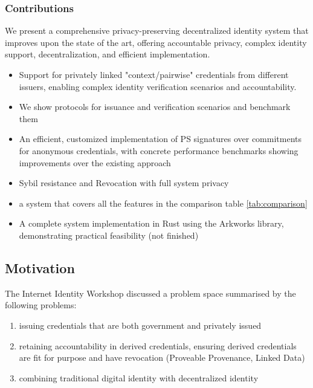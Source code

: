 \subsubsection{Contributions}
We present a comprehensive privacy-preserving decentralized identity system that improves upon the state of the art, offering accountable privacy, complex identity support, decentralization, and efficient implementation.
\begin{itemize}
    
    \item Support for privately linked "context/pairwise" credentials from different issuers, enabling complex identity verification scenarios and accountability. 
    
    \item We show protocols for issuance and verification scenarios and benchmark them

    \item An efficient, customized implementation of PS signatures over commitments for anonymous credentials, with concrete performance benchmarks showing improvements over the existing approach
    
    \item Sybil resistance and Revocation with full system privacy

    \item a system that covers all the features in the comparison table \ref{tab:comparison} 
    
    \item A complete system implementation in Rust using the Arkworks library, demonstrating practical feasibility (not finished)
    
\end{itemize}






\subsection{Motivation}

The Internet Identity Workshop discussed a problem space summarised by the following problems:
\begin{enumerate}
    \item issuing credentials that are both government and privately issued
    \item retaining accountability in derived credentials, ensuring derived credentials are fit for purpose and have revocation (Proveable Provenance, Linked Data)
    \item combining traditional digital identity with decentralized identity
\end{enumerate}

